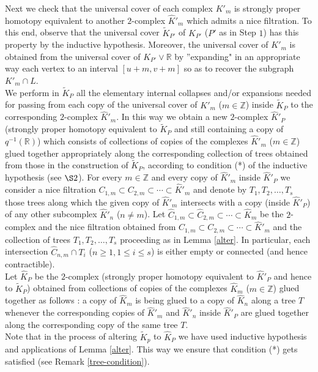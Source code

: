 \documentclass{amsart}[12pt]
\theoremstyle{definition}
\theoremstyle{remark}
\numberwithin{equation}{section}
\begin{document}
 Next we check that the universal cover of
each complex $K'_m$ is strongly proper homotopy equivalent to
another $2$-complex $\widehat{K}'_m$ which admits a nice
filtration. To this end, observe that the universal cover
$\widetilde{K}_{P'}$ of $K_{P'}$ ($P'$ as in Step $1$) has this
property by the inductive hypothesis. Moreover, the universal
cover of $K'_m$ is obtained from the universal cover of $K_{P'}
\vee {\mathbb R}$ by ''expanding" in an appropriate way each vertex to an
interval $[u+m,v+m]$ so as to recover the subgraph $K'_m \cap L$.\\
\indent We perform in $\widetilde{K}_P$ all the elementary
internal collapses and/or expansions needed for passing from each
copy of the universal cover of $K'_m$ ($m \in {\mathbb Z}$) inside
$\widetilde{K}_P$ to the corresponding $2$-complex
$\widehat{K}'_m$. In this way we obtain a new $2$-complex
$\widehat{K}'_P$ (strongly proper homotopy equivalent to
$\widetilde{K}_P$ and still containing a copy of $q^{-1}({\mathbb R})$)
which consists of collections of copies of the complexes
$\widehat{K}'_m$ ($m \in {\mathbb Z}$) glued together appropriately along
the corresponding collection of trees obtained from those in the
construction of $\widetilde{K}_P$, according to condition (*) of
the inductive hypothesis (see $\S 2$). For every $m \in {\mathbb Z}$ and
every copy of $\widehat{K}'_m$ inside $\widehat{K}'_P$ we consider
a nice filtration $C_{1,m} {\subset} C_{2,m} {\subset} \cdots {\subset}
\widehat{K}'_m$ and denote by $T_1, T_2, \dots, T_s$ those trees
along which the given copy of $\widehat{K}'_m$ intersects with a
copy (inside $\widehat{K}'_P$) of any other subcomplex
$\widehat{K}'_n$ ($n \neq m$). Let $\widehat{C}_{1,m} {\subset}
\widehat{C}_{2,m} {\subset} \cdots {\subset} \widehat{K}_m$ be the
$2$-complex and the nice filtration obtained from $C_{1,m} {\subset}
C_{2,m} {\subset} \cdots {\subset} \widehat{K}'_m$ and the collection of
trees $T_1, T_2, \dots, T_s$ proceeding as in Lemma \ref{alter}.
In particular, each intersection $\widehat{C}_{n,m} \cap T_i$ ($n
\geq 1, 1 \leq i \leq s$) is either empty or connected (and
hence contractible).\\
\indent Let $\widehat{K}_P$ be the $2$-complex (strongly proper
homotopy equivalent to $\widehat{K}'_P$ and hence to
$\widetilde{K}_P$) obtained from collections of copies of the
complexes $\widehat{K}_m$ ($m \in {\mathbb Z}$) glued together as follows
: a copy of $\widehat{K}_m$ is being glued to a copy of
$\widehat{K}_n$ along a tree $T$ whenever the corresponding copies
of $\widehat{K}'_m$ and $\widehat{K}'_n$ inside $\widehat{K}'_P$
are glued together along the corresponding copy of the same tree
$T$.\\
\indent Note that in the process of altering $\widetilde{K}_p$ to
$\widehat{K}_P$ we have used inductive hypothesis and applications
of Lemma \ref{alter}. This way we ensure that
condition (*) gets satisfied (see Remark \ref{tree-condition}).\\
\end{document}
